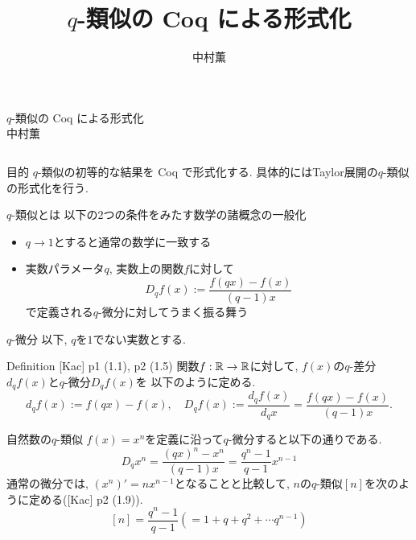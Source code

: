 \documentclass[unicode,mathserif]{beamer}
\title{$q$-類似の Coq による形式化}
\author{中村薫}
\begin{document}
\begin{frame}[fragile]
    \begin{center}
      {\Huge $q$-類似の Coq による形式化} \\
      {\Large 中村薫} 
    \end{center}

	\begin{columns}[T]
		\begin{column}{0.33\columnwidth}
			\begin{block}{目的}
				$q$-類似の初等的な結果を Coq で形式化する.
				具体的にはTaylor展開の$q$-類似の形式化を行う. 
			\end{block}
			
		\begin{block}{$q$-類似とは}
			以下の2つの条件をみたす数学の諸概念の一般化
			\begin{itemize}
				\item $q \to 1$とすると通常の数学に一致する
	          \item 実数パラメータ$q$, 実数上の関数$f$に対して
					\[
						D_q f(x) := \frac{f(qx) - f(x)}{(q - 1) x}
					\]
					で定義される$q$-微分に対してうまく振る舞う
			\end{itemize}
		\end{block}

		\begin{block}{$q$-微分}
			以下, $q$を$1$でない実数とする.
			\begin{itembox}{Definition [Kac] p1 (1.1), p2 (1.5)}
				関数$f : \mathbb R \to \mathbb R$に対して, $f(x)$の$q$-差分$d_q f(x)$と$q$-微分$D_q f(x)$を
				以下のように定める.  
				\[
					d_q f(x) := f (qx) - f(x), \quad
					D_q f(x) := \frac{d_q f(x)}{d_q x} = \frac{f(qx) - f(x)}{(q - 1) x}.
				\]
			\end{itembox}
		\end{block}
   
		\begin{block}{自然数の$q$-類似}
			$f(x) = x^n$を定義に沿って$q$-微分すると以下の通りである. 
			\[
				D_q x^n = \frac{(qx)^n - x^n}{(q - 1) x}
							= \frac{q^n - 1}{q - 1} x^{n - 1}
			\]
			通常の微分では, $(x^n)' = n x^{n - 1}$となることと比較して, 
			$n$の$q$-類似$[n]$を次のように定める([Kac] p2 (1.9)).
			\[
				[n] = \frac{q^n - 1}{q - 1} (= 1 + q + q^2 + \cdots q^{n - 1})
			\]
		\end{block}


\end{column}
\end{columns}
\end{frame}
\end{document}
